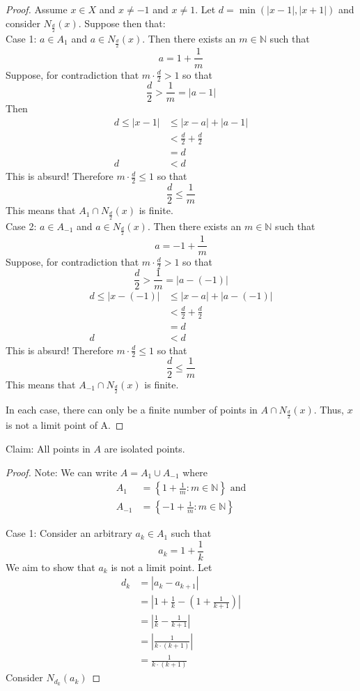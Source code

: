 \documentclass{amsart}
\begin{document}
\begin{enumerate}[1.]
\begin{proof}
Assume $x \in X$ and $x \neq -1$ and $x \neq 1$. 
Let $d = \min(|x - 1|, |x + 1|)$ and consider $N_\frac{d}{2}(x)$.
Suppose then that: \\

Case 1: $a \in A_1$ and $a \in N_\frac{d}{2}(x)$.
Then there exists an $m \in \mathbb{N}$ such that
\[
    a = 1 + \frac{1}{m}    
\]
Suppose, for contradiction that $m\cdot \frac{d}{2} > 1$ so that
\[
    \frac{d}{2} > \frac{1}{m} = |a - 1|    
\]
Then
\begin{align*}
    d \leq |x - 1| &\leq |x - a| + |a - 1| \\
    &< \frac{d}{2} + \frac{d}{2}\\
    &= d\\
    d &< d
\end{align*}
This is absurd! Therefore $m\cdot \frac{d}{2} \leq 1$ so that 
\[
    \frac{d}{2} \leq \frac{1}{m}
\]
This means that $A_1 \cap N_\frac{d}{2}(x)$ is finite. \\

Case 2: $a \in A_{-1}$ and $a \in N_\frac{d}{2}(x)$.
Then there exists an $m \in \mathbb{N}$ such that
\[
    a = -1 + \frac{1}{m}    
\]
Suppose, for contradiction that $m\cdot \frac{d}{2} > 1$ so that
\[
    \frac{d}{2} > \frac{1}{m} = |a - (-1)|    
\]
\begin{align*}
    d \leq |x - (-1)| &\leq |x - a| + |a - (-1)| \\
    &< \frac{d}{2} + \frac{d}{2}\\
    &= d\\
    d &< d
\end{align*}
This is absurd! Therefore $m\cdot \frac{d}{2} \leq 1$ so that 
\[
    \frac{d}{2} \leq \frac{1}{m}
\]
This means that $A_{-1} \cap N_\frac{d}{2}(x)$ is finite.

In each case, there can only be a finite number of points in
$A \cap N_\frac{d}{2}(x)$. Thus, $x$ is not a limit point of A.

\end{proof}

Claim: All points in $A$ are isolated points.
\begin{proof}
    Note: We can write $A = A_1 \cup A_{-1}$ where 
    \begin{align*}
        A_1 &= \left\{1+ \frac{1}{m}: m\in \mathbb{N}\right\} \text{ and} \\
        A_{-1} &= \left\{-1+ \frac{1}{m}: m\in \mathbb{N}\right\}
    \end{align*}

Case 1: Consider an arbitrary $a_k \in A_1$ such that
\[
    a_k = 1 + \frac{1}{k}
\]
We aim to show that $a_k$ is not a limit point.
Let 
\begin{align*}
    d_k &= |a_k - a_{k+1}| \\
    &= \left| 1 + \frac{1}{k} - \left(1 + \frac{1}{k+1}\right)\right|\\
    &= \left| \frac{1}{k} - \frac{1}{k+1} \right| \\
    &= \left| \frac{1}{k\cdot (k+1)} \right| \\
    &= \frac{1}{k\cdot (k+1)}
\end{align*}
Consider $N_{d_k}(a_k)$


\end{proof}
\end{enumerate}
\end{document}
